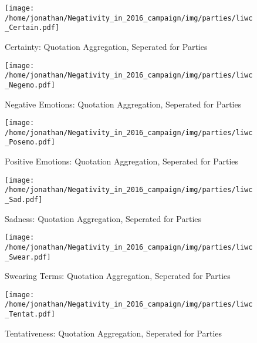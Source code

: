 \begin{figure}[h]\centering
\texttt{[image: /home/jonathan/Negativity\_in\_2016\_campaign/img/parties/liwc\_Certain.pdf]}
\caption{Certainty: Quotation Aggregation, Seperated for Parties}
\label{fig: parties_Certainty}
\end
{figure}

\begin{figure}[h]\centering
\texttt{[image: /home/jonathan/Negativity\_in\_2016\_campaign/img/parties/liwc\_Negemo.pdf]}
\caption{Negative Emotions: Quotation Aggregation, Seperated for Parties}
\label{fig: parties_Negative Emotions}
\end
{figure}

\begin{figure}[h]\centering
\texttt{[image: /home/jonathan/Negativity\_in\_2016\_campaign/img/parties/liwc\_Posemo.pdf]}
\caption{Positive Emotions: Quotation Aggregation, Seperated for Parties}
\label{fig: parties_Positive Emotions}
\end
{figure}

\begin{figure}[h]\centering
\texttt{[image: /home/jonathan/Negativity\_in\_2016\_campaign/img/parties/liwc\_Sad.pdf]}
\caption{Sadness: Quotation Aggregation, Seperated for Parties}
\label{fig: parties_Sadness}
\end
{figure}

\begin{figure}[h]\centering
\texttt{[image: /home/jonathan/Negativity\_in\_2016\_campaign/img/parties/liwc\_Swear.pdf]}
\caption{Swearing Terms: Quotation Aggregation, Seperated for Parties}
\label{fig: parties_Swearing Terms}
\end
{figure}

\begin{figure}[h]\centering
\texttt{[image: /home/jonathan/Negativity\_in\_2016\_campaign/img/parties/liwc\_Tentat.pdf]}
\caption{Tentativeness: Quotation Aggregation, Seperated for Parties}
\label{fig: parties_Tentativeness}
\end
{figure}

\clearpage
\pagebreak

